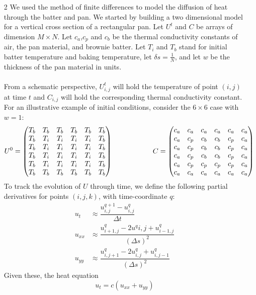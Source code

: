 \documentclass[11pt, fullpage]{article}
\begin{document}
\begin{enumerate}
\item[2] We used the method of finite differences to model the diffusion of heat through the batter and pan.  We started by building a two dimensional model for a vertical cross section of a rectangular pan.  Let $U^t$ and $C$ be arrays of dimension $M \times N$.  Let $c_a$,$c_p$ and $c_b$ be the thermal conductivity constants of air, the pan material, and brownie batter.  Let $T_i$ and $T_b$ stand for initial batter temperature and baking temperature, let $\delta s = \frac{1}{N}$, and let $w$ be the thickness of the pan material in units.\\
\\
From a schematic perspective, $U^t_{i,j}$ will hold the temperature of point $(i,j)$ at time $t$ and $C_{i,j}$ will hold the corresponding thermal conductivity constant.  For an illustrative example of initial conditions, consider the $6 \times 6$ case with $w = 1$:
\[U^0 = \begin{pmatrix} T_b&T_b&T_b&T_b&T_b&T_b\\
					T_b&T_i &T_i&T_i&T_i&T_b\\
					T_b&T_i &T_i&T_i&T_i&T_b\\
					T_b&T_i &T_i&T_i&T_i&T_b\\
					T_b&T_i &T_i&T_i&T_i&T_b\\
					T_b&T_b&T_b&T_b&T_b&T_b \end{pmatrix} \hspace{20mm}
  C = \begin{pmatrix} c_a&c_a&c_a&c_a&c_a&c_a\\
				   c_a &c_p &c_b&c_b&c_p&c_a\\
				    c_a &c_p &c_b&c_b&c_p&c_a\\
  				 c_a &c_p &c_b&c_b&c_p&c_a\\
				 c_a &c_p &c_p&c_p&c_p&c_a\\
				c_a&c_a&c_a&c_a&c_a&c_a \end{pmatrix} \]		
To track the evolution of $U$ through time, we define the following partial derivatives for points $(i,j,k)$, with time-coordinate $q$: \begin{align*}
u_t &\approx \dfrac{u_{i,j}^{q+1} - u_{i,j}^q}{\Delta t}\\
u_{xx} &\approx \dfrac{u_{i+1,j}^q - 2u^q{i,j} + u_{i-1,j}^q}{(\Delta s)^2}\\
u_{yy} &\approx \dfrac{u_{i,j+1}^q - 2u_{i,j}^q + u_{i,j-1}^q}{(\Delta s)^2} \end{align*}
Given these, the heat equation
\[u_t = c (u_{xx} + u_{yy})\]

\end{enumerate}
\end{document}
